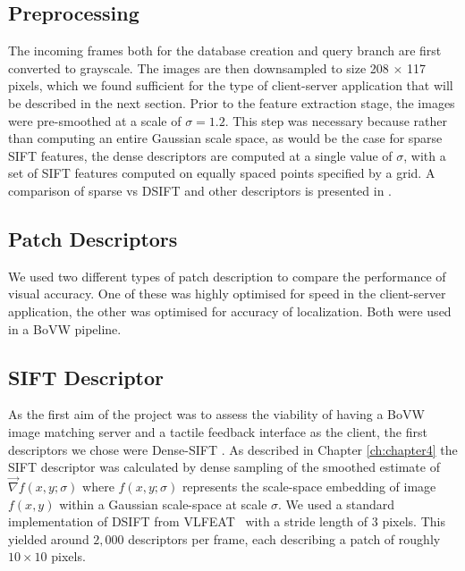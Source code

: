 \subsection{Preprocessing}

The incoming frames both for the database creation and query branch are first converted to grayscale. The images are then downsampled to size 208 $\times$ 117 pixels, which we found sufficient for the type of client-server application that will be described in the next section. Prior to the feature extraction stage, the images were pre-smoothed at a scale of $\sigma = 1.2$. This step was necessary because rather than computing an entire Gaussian scale space, as would be the case for sparse SIFT features, the dense descriptors are computed at a single value of $\sigma$, with a set of SIFT features computed on equally spaced points specified by a grid. A comparison of sparse vs DSIFT and other descriptors is presented in \citep{Rivera-Rubio2015PRL}.

\subsection{Patch Descriptors}
We used two different types of patch description to compare the performance of visual accuracy.  One of these was highly optimised for speed in the client-server application, the other was optimised for accuracy of localization.  Both were used in a BoVW pipeline.


\subsection{SIFT Descriptor}
As the first aim of the project was to assess the viability of having a BoVW image matching server and a tactile feedback interface as the client, the first descriptors we chose were Dense-SIFT \citep{Lowe1999,LazebnikSP06,Vedaldi2008}. As described in Chapter \ref{ch:chapter4} the SIFT descriptor was calculated by dense sampling of the smoothed estimate of $\vec{\nabla}f(x,y;\sigma)$ where $f(x,y;\sigma)$ represents the scale-space embedding of image $f(x,y)$ within a Gaussian scale-space at scale $\sigma$.  We used a standard implementation of DSIFT from VLFEAT~\citep{Vedaldi2008} with a stride length of 3 pixels. This yielded around $2,000$ descriptors per frame, each describing a patch of roughly $10 \times 10$ pixels.


